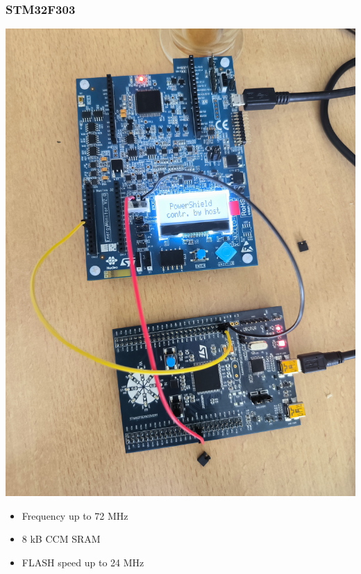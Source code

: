 \documentclass[
	11pt, %
]{beamer}
\begin{document}
\begin{frame}
    \frametitle{STM32F303}
		\centering
		\begin{minipage}{0.4\textwidth}
            \includegraphics[scale = 0.04]{images/stm32f.jpg}
        \end{minipage}
        \begin{minipage}{0.5\textwidth}
			\centering
            \begin{itemize}
                \item Frequency up to 72 MHz 
                \item 8 kB CCM SRAM 
                \item FLASH speed up to 24 MHz
            \end{itemize}
		\end{minipage}
\end{frame}
\end{document}
